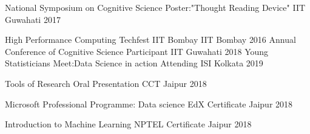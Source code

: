 
\vspace{-0.3cm}



\begin{cvhonors}


  \cvhonor
  {National Symposium on Cognitive Science} %
  {Poster:"Thought Reading Device"} %
  {IIT Guwahati} %
  {2017} %

  \cvhonor
  {High Performance Computing}
  {Techfest IIT Bombay}
  {IIT Bombay}
  {2016}
  \cvhonor
  {Annual Conference of Cognitive Science} %
  {Participant}
  {IIT Guwahati} %
  {2018} %
  \cvhonor
  {Young Statisticians Meet:Data Science in action} %
  {Attending} %
  {ISI Kolkata} %
  {2019} %

  \cvhonor
  {Tools of Research}
  {Oral Presentation}
  {CCT Jaipur}
  {2018}

  \cvhonor
  {Microsoft Professional Programme: Data science}
  {EdX Certificate}
  {Jaipur}
  {2018}

  \cvhonor
  {Introduction to Machine Learning}
  {NPTEL Certificate}
  {Jaipur}
  {2018}




\end{cvhonors}

